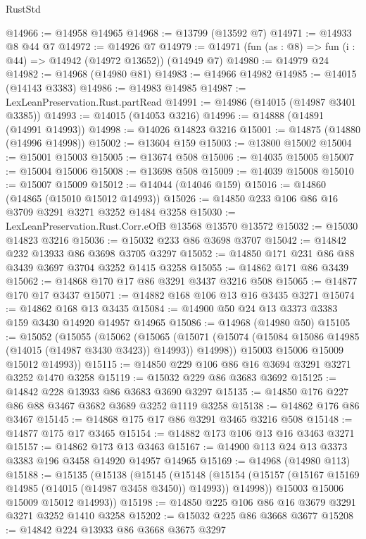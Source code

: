 \begin{lexlean}{RustStd}
\begin{coremodule}
@14966 := @14958 @14965
@14968 := @13799 (@13592 @7)
@14971 := @14933 @8 @44 @7
@14972 := @14926 @7
@14979 := @14971 (fun (as : @8) => fun (i : @44) => @14942 (@14972 @13652)) (@14949 @7)
@14980 := @14979 @24
@14982 := @14968 (@14980 @81)
@14983 := @14966 @14982
@14985 := @14015 (@14143 @3383)
@14986 := @14983 @14985
@14987 := LexLeanPreservation.Rust.partRead
@14991 := @14986 (@14015 (@14987 @3401 @3385))
@14993 := @14015 (@14053 @3216)
@14996 := @14888 (@14891 (@14991 @14993))
@14998 := @14026 @14823 @3216
@15001 := @14875 (@14880 (@14996 @14998))
@15002 := @13604 @159
@15003 := @13800 @15002
@15004 := @15001 @15003
@15005 := @13674 @508
@15006 := @14035 @15005
@15007 := @15004 @15006
@15008 := @13698 @508
@15009 := @14039 @15008
@15010 := @15007 @15009
@15012 := @14044 (@14046 @159)
@15016 := @14860 (@14865 (@15010 @15012 @14993))
@15026 := @14850 @233 @106 @86 @16 @3709 @3291 @3271 @3252 @1484 @3258
@15030 := LexLeanPreservation.Rust.Corr.eOfB @13568 @13570 @13572
@15032 := @15030 @14823 @3216
@15036 := @15032 @233 @86 @3698 @3707
@15042 := @14842 @232 @13933 @86 @3698 @3705 @3297
@15052 := @14850 @171 @231 @86 @88 @3439 @3697 @3704 @3252 @1415 @3258
@15055 := @14862 @171 @86 @3439
@15062 := @14868 @170 @17 @86 @3291 @3437 @3216 @508
@15065 := @14877 @170 @17 @3437
@15071 := @14882 @168 @106 @13 @16 @3435 @3271
@15074 := @14862 @168 @13 @3435
@15084 := @14900 @50 @24 @13 @3373 @3383 @159 @3430 @14920 @14957 @14965
@15086 := @14968 (@14980 @50)
@15105 := @15052
    (@15055
      (@15062
        (@15065
          (@15071 (@15074 (@15084 @15086 @14985 (@14015 (@14987 @3430 @3423)) @14993)) @14998))
        @15003
        @15006
        @15009
        @15012
        @14993))
@15115 := @14850 @229 @106 @86 @16 @3694 @3291 @3271 @3252 @1470 @3258
@15119 := @15032 @229 @86 @3683 @3692
@15125 := @14842 @228 @13933 @86 @3683 @3690 @3297
@15135 := @14850 @176 @227 @86 @88 @3467 @3682 @3689 @3252 @1119 @3258
@15138 := @14862 @176 @86 @3467
@15145 := @14868 @175 @17 @86 @3291 @3465 @3216 @508
@15148 := @14877 @175 @17 @3465
@15154 := @14882 @173 @106 @13 @16 @3463 @3271
@15157 := @14862 @173 @13 @3463
@15167 := @14900 @113 @24 @13 @3373 @3383 @196 @3458 @14920 @14957 @14965
@15169 := @14968 (@14980 @113)
@15188 := @15135
    (@15138
      (@15145
        (@15148
          (@15154 (@15157 (@15167 @15169 @14985 (@14015 (@14987 @3458 @3450)) @14993)) @14998))
        @15003
        @15006
        @15009
        @15012
        @14993))
@15198 := @14850 @225 @106 @86 @16 @3679 @3291 @3271 @3252 @1410 @3258
@15202 := @15032 @225 @86 @3668 @3677
@15208 := @14842 @224 @13933 @86 @3668 @3675 @3297

\end{coremodule}
\end{lexlean}
